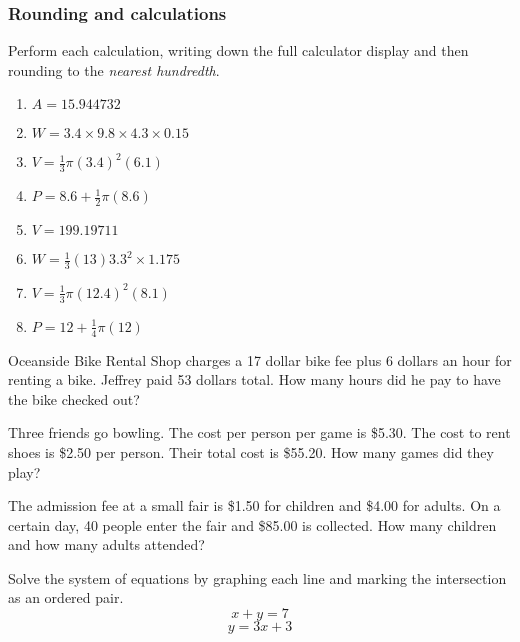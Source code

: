 \subsubsection*{Rounding and calculations}
  \item Perform each calculation, writing down the full calculator display and then rounding to the \emph{nearest hundredth}.
    \begin{multicols}{2}
    \begin{enumerate}[itemsep=2cm]
      \item $A=15.944732$
      \item $W=3.4 \times 9.8 \times 4.3 \times 0.15$
            
      \item $V=\frac{1}{3} \pi (3.4)^2(6.1)$
      \item $P=8.6 + \frac{1}{2} \pi (8.6)$  
      \item $V=199.19711$
      \item $W=\frac{1}{3} (13)  3.3^2 \times 1.175$
      \item $V=\frac{1}{3} \pi (12.4)^2(8.1)$
      \item $P=12 + \frac{1}{4} \pi (12)$ 
    \end{enumerate}
    \end{multicols}\vspace{2cm}
  
     
  
  \newpage
    \item Oceanside Bike Rental Shop charges a 17 dollar bike fee plus 6 dollars an hour for renting a bike. Jeffrey paid 53 dollars total. How many hours did he pay to have the bike checked out? \vspace{6cm}
  
    \item Three friends go bowling. The cost per person per game is \$5.30. The cost to rent shoes is \$2.50 per person. Their total cost is \$55.20. How many games did they play? \vspace{6cm}
  
    \item The admission fee at a small fair is \$1.50 for children and \$4.00 for adults. On a certain day, 40 people enter the fair and \$85.00 is collected. How many children and how many adults attended?
  
\newpage
\item Solve the system of equations by graphing each line and marking the intersection as an ordered pair.
      \[x+y=7\]
      \[y=3x+3\]
  
